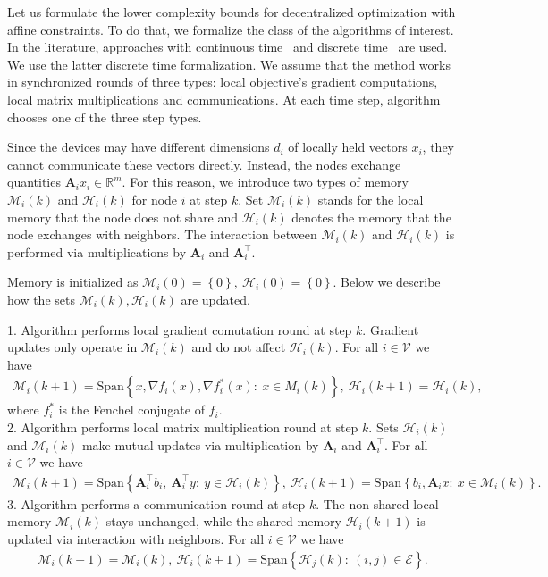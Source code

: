 \documentclass{article}
\newcommand{\Span}{\mathrm{Span}}
\newcommand{\R}{\mathbb{R}}
\newcommand{\cM}{\mathcal{M}}
\newcommand{\cH}{\mathcal{H}}
\newcommand{\cV}{\mathcal{V}}
\newcommand{\cE}{\mathcal{E}}
\newcommand{\mA}{\mathbf{A}}
\newcommand{\braces}[1]{\left\{ #1 \right\}}
\begin{document}
Let us formulate the lower complexity bounds for decentralized optimization with affine constraints. To do that, we formalize the class of the algorithms of interest. In the literature, approaches with continuous time~\cite{scaman2017optimal} and discrete time~\cite{kovalev2021lower} are used. We use the latter discrete time formalization. We assume that the method works in synchronized rounds of three types: local objective's gradient computations, local matrix multiplications and communications. At each time step, algorithm chooses one of the three step types.

Since the devices may have different dimensions $d_i$ of locally held vectors $x_i$, they cannot communicate these vectors directly. Instead, the nodes exchange quantities $\mA_i x_i\in\R^m$. For this reason, we introduce two types of memory $\cM_i(k)$ and $\cH_i(k)$ for node $i$ at step $k$. Set $\cM_i(k)$ stands for the local memory that the node does not share and $\cH_i(k)$ denotes the memory that the node exchanges with neighbors. The interaction between $\cM_i(k)$ and $\cH_i(k)$ is performed via multiplications by $\mA_i$ and $\mA_i^\top$.

Memory is initialized as $\cM_i(0) = \braces{0},~ \cH_i(0) = \braces{0}$. Below we describe how the sets $\cM_i(k), \cH_i(k)$ are updated.

1. Algorithm performs local gradient comutation round at step $k$. Gradient updates only operate in $\cM_i(k)$ and do not affect $\cH_i(k)$. For all $i\in\cV$ we have
\begin{align*}
	\cM_i(k+1) = \Span\braces{x, \nabla f_i(x), \nabla f_i^*(x):~ x\in M_i(k)},~ \cH_i(k+1) = \cH_i(k),
\end{align*}
where $f_i^*$ is the Fenchel conjugate of $f_i$.\\
2. Algorithm performs local matrix multiplication round at step $k$. Sets $\cH_i(k)$ and $\cM_i(k)$ make mutual updates via multiplication by $\mA_i$ and $\mA_i^\top$. For all $i\in\cV$ we have
\begin{align*}
	\cM_i(k+1) = \Span\braces{\mA_i^\top b_i,~ \mA_i^\top y:~ y\in \cH_i(k)},~ \cH_i(k+1) = \Span\braces{b_i, \mA_i x:~ x\in \cM_i(k)}.
\end{align*}
3. Algorithm performs a communication round at step $k$. The non-shared local memory $\cM_i(k)$ stays unchanged, while the shared memory $\cH_i(k+1)$ is updated via interaction with neighbors. For all $i\in\cV$ we have
\begin{align*}
	\cM_i(k+1) = \cM_i(k),~ \cH_i(k+1) = \Span\braces{\cH_j(k):~ (i, j)\in\cE}.
\end{align*}
\end{document}
